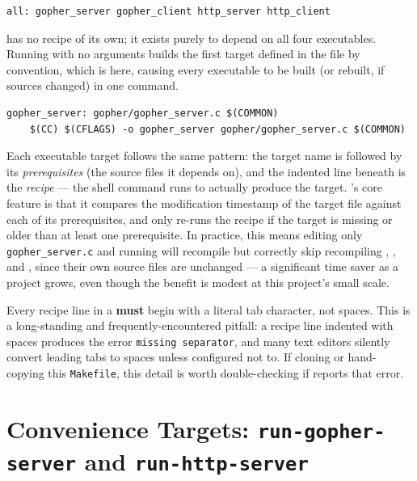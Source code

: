 \begin{lstlisting}[style=bashstyle, numbers=none]
all: gopher_server gopher_client http_server http_client
\end{lstlisting}

 has no recipe of its own; it exists purely to depend on all four executables. Running  with no arguments builds the first target defined in the file by convention, which is  here, causing every executable to be built (or rebuilt, if sources changed) in one command.

\begin{lstlisting}[style=bashstyle, numbers=none]
gopher_server: gopher/gopher_server.c $(COMMON)
	$(CC) $(CFLAGS) -o gopher_server gopher/gopher_server.c $(COMMON)
\end{lstlisting}

Each executable target follows the same pattern: the target name is followed by its \emph{prerequisites} (the source files it depends on), and the indented line beneath is the \emph{recipe} --- the shell command  runs to actually produce the target. 's core feature is that it compares the modification timestamp of the target file against each of its prerequisites, and only re-runs the recipe if the target is missing or older than at least one prerequisite. In practice, this means editing only \texttt{gopher\_server.c} and running  will recompile  but correctly skip recompiling , , and , since their own source files are unchanged --- a significant time saver as a project grows, even though the benefit is modest at this project's small scale.

\begin{warnbox}
Every recipe line in a  \textbf{must} begin with a literal tab character, not spaces. This is a long-standing and frequently-encountered  pitfall: a recipe line indented with spaces produces the error \texttt{missing separator}, and many text editors silently convert leading tabs to spaces unless configured not to. If cloning or hand-copying this \texttt{Makefile}, this detail is worth double-checking if  reports that error.
\end{warnbox}

\section{Convenience Targets: \texttt{run-gopher-server} and \texttt{run-http-server}}

